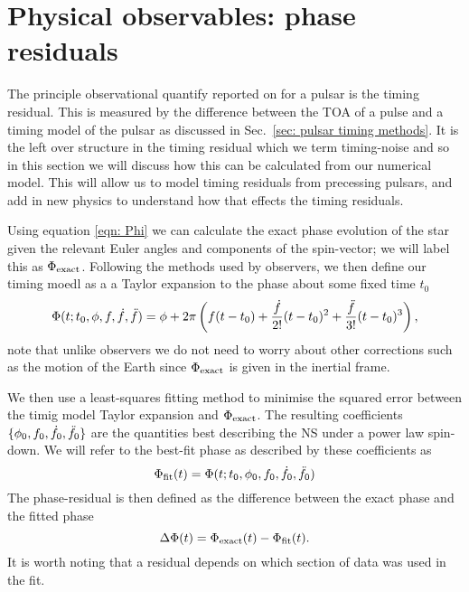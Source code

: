 \documentclass[../full_thesis/full_thesis.tex]{subfiles}
\begin{document}
\section{Physical observables: phase residuals}
\label{sec: timing residuals}

The principle observational quantify reported on for a pulsar is the timing
residual. This is measured by the difference between the TOA of a pulse and a
timing model of the pulsar as discussed in Sec.~\ref{sec: pulsar timing
methods}. It is the left over structure in the timing residual which we
term timing-noise and so in this section we will discuss how this can be calculated
from our numerical model. This will allow us to model timing residuals from
precessing pulsars, and add in new physics to understand how that effects the
timing residuals.

Using equation \eqref{eqn: Phi} we can calculate the exact phase evolution of
the star given the relevant Euler angles and components of the spin-vector; we
will label this as $\Phi_{\mathrm{exact}}$. Following the methods used by observers, we
then define our timing moedl as a
a Taylor expansion to the phase about some fixed time $t_{0}$
\begin{equation}
    \Phi(t; t_{0}, \phi, f, \dot{f}, \ddot{f}) =
    \phi + 2\pi \left(f(t - t_{0}) +
                          \frac{\dot{f}}{2!}(t-t_{0})^{2} +
                          \frac{\ddot{f}}{3!}(t-t_{0})^{3}
                          \right),
\label{eqn: TR taylor expansion}
\end{equation}
note that unlike observers we do not need to worry about other corrections such
as the motion of the Earth since $\Phi_{\mathrm{exact}}$ is given in the inertial frame.

We then use a least-squares fitting method to minimise the squared error
between the timig model Taylor expansion and $\Phi_{\mathrm{exact}}$. The resulting
coefficients $\{\phi_{0}, f_{0}, \dot{f}_{0}, \ddot{f}_{0}\}$ are the quantities
best describing the NS under a power law spin-down. We will refer to the
best-fit phase as described by  these coefficients as
\begin{equation}
    \Phi_{\mathrm{fit}}(t) = \Phi(t; t_{0}, \phi_{0}, f_{0}, \dot{f}_{0}, \ddot{f}_{0})
\end{equation}
The phase-residual is then defined as the difference between the exact phase
and the fitted phase
\begin{equation}
  \Delta\Phi(t) = \Phi_{\mathrm{exact}}(t) - \Phi_{\mathrm{fit}}(t).
\end{equation}
It is worth noting that a residual depends on which section of data was
used in the fit.
\end{document}
